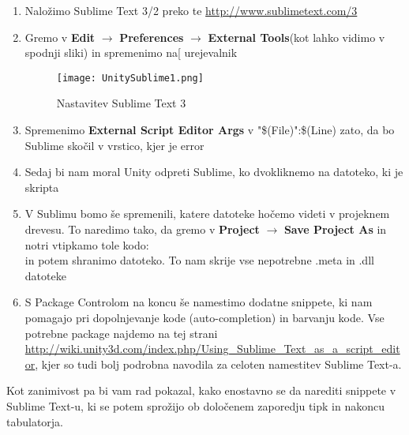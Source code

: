 \begin{enumerate}
	\item Naložimo Sublime Text 3/2 preko te \url{http://www.sublimetext.com/3}
	\item Gremo v \textbf{Edit} $\rightarrow$ \textbf{Preferences} $\rightarrow$ \textbf{External Tools}(kot lahko vidimo v spodnji sliki) in spremenimo na[ urejevalnik\\
	\begin{figure}[ht!]
  		\centering
		\texttt{[image: UnitySublime1.png]}
		\caption{Nastavitev Sublime Text 3}
	\end{figure}
	\item Spremenimo \textbf{External Script Editor Args} v "\$(File)":\$(Line) zato, da bo Sublime skočil v vrstico, kjer je error 
	\item Sedaj bi nam moral Unity odpreti Sublime, ko dvokliknemo na datoteko, ki je skripta
	\item V Sublimu bomo še spremenili, katere datoteke hočemo videti v projeknem drevesu. To naredimo tako, da gremo v \textbf{Project} $\rightarrow$ \textbf{Save Project As} in notri vtipkamo tole kodo:\\
	in potem shranimo datoteko. To nam skrije vse nepotrebne .meta in .dll datoteke
	\item S Package Controlom na koncu še namestimo dodatne snippete, ki nam pomagajo pri dopolnjevanje kode (auto-completion) in barvanju kode. Vse potrebne package najdemo na tej strani \url{http://wiki.unity3d.com/index.php/Using_Sublime_Text_as_a_script_editor}, kjer so tudi bolj podrobna navodila za celoten namestitev Sublime Text-a.
\end{enumerate}
Kot zanimivost pa bi vam rad pokazal, kako enostavno se da narediti snippete v Sublime Text-u, ki se potem sprožijo ob določenem zaporedju tipk in nakoncu tabulatorja. 
